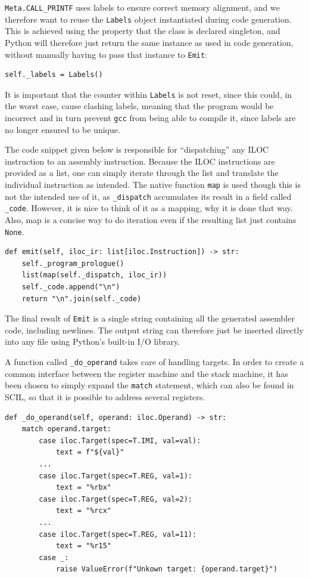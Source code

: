 \texttt{Meta.CALL\_PRINTF} uses labels to ensure correct memory alignment, and we therefore want to reuse the \texttt{Labels} object instantiated during code generation. This is achieved using the property that the class is declared singleton, and Python will therefore just return the same instance as used in code generation, without manually having to pass that instance to \texttt{Emit}:

\begin{verbatim}
self._labels = Labels()
\end{verbatim}

It is important that the counter within \texttt{Labels} is not reset, since this could, in the worst case, cause clashing labels, meaning that the program would be incorrect and in turn prevent \texttt{gcc} from being able to compile it, since labels are no longer ensured to be unique.

The code snippet given below is responsible for ``dispatching'' any ILOC instruction to an assembly instruction. Because the ILOC instructions are provided as a list, one can simply iterate through the list and translate the individual instruction as intended. The native function \texttt{map} is used though this is not the intended use of it, as \texttt{\_dispatch} accumulates its result in a field called \texttt{\_code}. However, it is nice to think of it as a mapping, why it is done that way. Also, map is a concise way to do iteration even if the resulting list just contains \texttt{None}.

\begin{verbatim}
def emit(self, iloc_ir: list[iloc.Instruction]) -> str:
    self._program_prologue()
    list(map(self._dispatch, iloc_ir))
    self._code.append("\n")
    return "\n".join(self._code)
\end{verbatim}

The final result of \texttt{Emit} is a single string containing all the generated assembler code, including newlines. The output string can therefore just be inserted directly into any file using Python's built-in I/O library.

A function called \texttt{\_do\_operand} takes care of handling targets. In order to create a common interface between the register machine and the stack machine, it has been chosen to simply expand the \texttt{match} statement, which can also be found in SCIL, so that it is possible to address several registers.

\begin{verbatim}
def _do_operand(self, operand: iloc.Operand) -> str:
    match operand.target:
        case iloc.Target(spec=T.IMI, val=val):
            text = f"${val}"
        ...
        case iloc.Target(spec=T.REG, val=1):
            text = "%rbx"
        case iloc.Target(spec=T.REG, val=2):
            text = "%rcx"
        ...
        case iloc.Target(spec=T.REG, val=11):
            text = "%r15"
        case _:
            raise ValueError(f"Unkown target: {operand.target}")
\end{verbatim}

